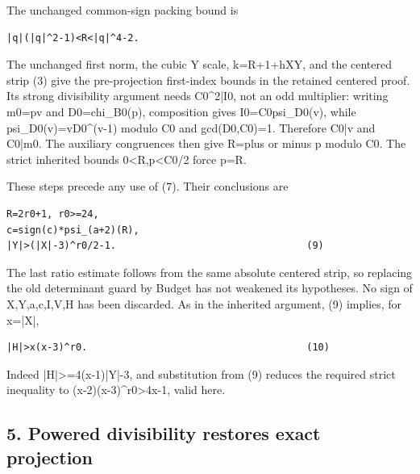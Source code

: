 The unchanged common-sign packing bound is



\begin{verbatim}
|q|(|q|^2-1)<R<|q|^4-2.
\end{verbatim}

The unchanged first norm, the cubic Y scale, k=\allowbreak{}R+\allowbreak{}1+\allowbreak{}hXY, and the centered strip (3) give the pre-projection first-index bounds in the retained centered proof. Its strong divisibility argument needs C0\textasciicircum{}\allowbreak{}2|I0, not an odd multiplier: writing m0=\allowbreak{}pv and D0=\allowbreak{}chi\_\allowbreak{}B0(p), composition gives I0=\allowbreak{}C0\textasteriskcentered{}\allowbreak{}psi\_\allowbreak{}D0(v), while psi\_\allowbreak{}D0(v)=\allowbreak{}vD0\textasciicircum{}\allowbreak{}(v-1) modulo C0 and gcd(D0,C0)=\allowbreak{}1. Therefore C0|v and C0|m0. The auxiliary congruences then give R=\allowbreak{}plus or minus p modulo C0. The strict inherited bounds 0\textless{}\allowbreak{}R,p\textless{}\allowbreak{}C0/\allowbreak{}2 force p=\allowbreak{}R.



These steps precede any use of (7). Their conclusions are



\begin{verbatim}
R=2r0+1, r0>=24,
c=sign(c)*psi_(a+2)(R),
|Y|>(|X|-3)^r0/2-1.                                 (9)
\end{verbatim}

The last ratio estimate follows from the same absolute centered strip, so replacing the old determinant guard by Budget has not weakened its hypotheses. No sign of X,Y,a,c,I,V,H has been discarded. As in the inherited argument, (9) implies, for x=\allowbreak{}|X|,



\begin{verbatim}
|H|>x(x-3)^r0.                                      (10)
\end{verbatim}

Indeed |H|\textgreater{}\allowbreak{}=\allowbreak{}4(x-1)|Y|-3, and substitution from (9) reduces the required strict inequality to (x-2)(x-3)\textasciicircum{}\allowbreak{}r0\textgreater{}\allowbreak{}4x-1, valid here.



\subsection*{5. Powered divisibility restores exact projection}



